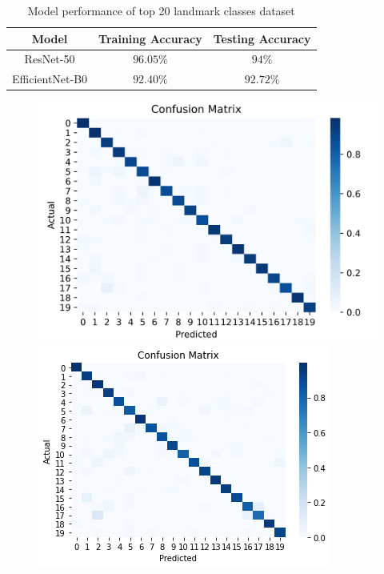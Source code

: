 \documentclass[10pt,twocolumn,letterpaper]{article}
\begin{document}
\begin{table}[]
    \centering
    \begin{tabular}{c c c}
        \hline Model & Training Accuracy & Testing Accuracy \\ \hline
        ResNet-50 & $96.05\%$ & $94\%$ \\
        EfficientNet-B0 & $92.40\%$ & $92.72\%$ \\ \hline
    \end{tabular}
    \vspace{5pt}
    \caption{Model performance of top 20 landmark classes dataset}
    \label{tab:table2}
\end{table}

\begin{figure}
    \centering
    \begin{minipage}[t]{0.4\textwidth}
        \includegraphics[width=\textwidth]{img/top20_test_resnet.png}
    \end{minipage}
    \begin{minipage}[t]{0.4\textwidth}
        \includegraphics[width=\textwidth]{img/top20_test_efficientnet.png}

\end{minipage}
\end{figure}
\end{document}
